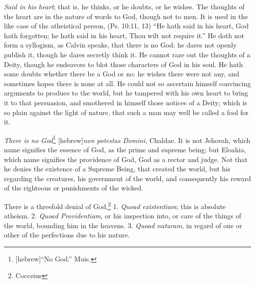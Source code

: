 \documentclass{article}
\newcommand{\heb}{[hebrew]}
\begin{document}
\emph{Said in his heart}; that is, he thinks, or he doubts, or he wishes.
The thoughts of the heart are in the nature of words to God, though not to men. 
It is used in the like case of the atheistical person, 
    (Ps. 10:11, 13) ``He hath said in his heart, God hath forgotten; 
    he hath said in his heart, Thou wilt not require it.'' 
He doth not form a syllogism, as Calvin speaks, that there is no God: 
    he dares not %
    openly publish it, though he dares secretly think it. 
He cannot raze out the thoughts of a Deity, 
    though he endeavors to blot those characters of God in his soul. 
He hath some doubts whether there be a God or no: 
    he wishes there were not any, 
    and sometimes hopes there is none at all. 
He could not so ascertain himself convincing arguments to produce to the world, 
    but he tampered with his own heart to bring it to that persuasion, 
    and smothered in himself those notices of a Deity; 
    which is so plain against the light of nature, 
    that such a man may well be called a fool for it.

\emph{There is no God}\footnote{\heb ``No God.'' Muis.} 
    \heb \emph{non potestas Domini}, Chaldae. 
It is not Jehovah, which name signifies the essence of God, 
    as the prime and supreme being; 
    but Eloahia, which name signifies the providence of God, 
    God as a rector and judge. 
Not that he denies the existence of a Supreme Being, 
    that created the world, but his regarding the creatures, 
    his government of the world, 
    and consequently his reward of the righteous or punishments of the wicked.

There is a threefold denial of God,\footnote{Cocceius} 
    1. \emph{Quoad existentiam}; this is absolute atheism. 
    2. \emph{Quoad Providentiam}, or his inspection into, 
    or care of the things of the world, bounding him in the heavens. 
    3. \emph{Quoad naturam}, in regard of one or other of the perfections 
    due to his nature. 
\end{document}

